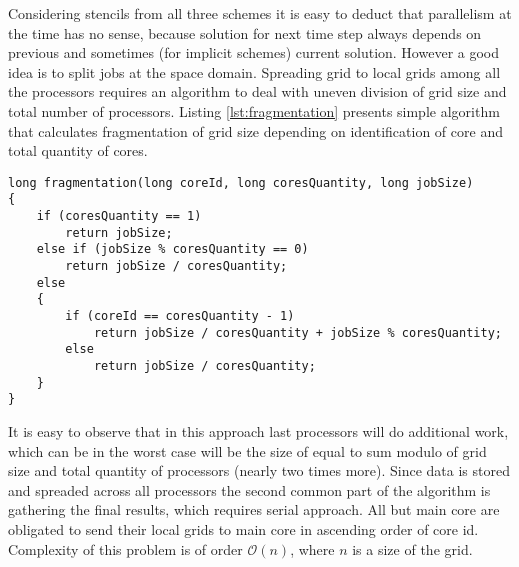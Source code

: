 	Considering \gls{stencil}s from all three schemes it is easy to deduct that parallelism at the time has no sense, because solution for next time step always depends on previous and sometimes (for implicit schemes) current solution. However a good idea is to split jobs at the space domain. Spreading grid to local grids among all the processors requires an algorithm to deal with uneven division of grid size and total number of processors. Listing \ref{lst:fragmentation} presents simple algorithm that calculates fragmentation of grid size depending on identification of core and total quantity of cores.
	\begin{lstlisting}[caption=test, label=lst:fragmentation] 
long fragmentation(long coreId, long coresQuantity, long jobSize)
{
	if (coresQuantity == 1)
		return jobSize;
	else if (jobSize % coresQuantity == 0)
		return jobSize / coresQuantity;
	else
	{
		if (coreId == coresQuantity - 1)
			return jobSize / coresQuantity + jobSize % coresQuantity;
		else
			return jobSize / coresQuantity;
	}
}
	\end{lstlisting} 
	It is easy to observe that in this approach last processors will do additional work, which can be in the worst case will be the size of equal to sum modulo of grid size and total quantity of processors (nearly two times more). Since data is stored and spreaded across all processors the second common part of the algorithm is gathering the final results, which requires serial approach. All but main core are obligated to send their local grids to main core in ascending order of core id. Complexity of this problem is of order $\mathcal{O}(n)$, where $n$ is a size of the grid.
	
	
	
	
	\clearpage